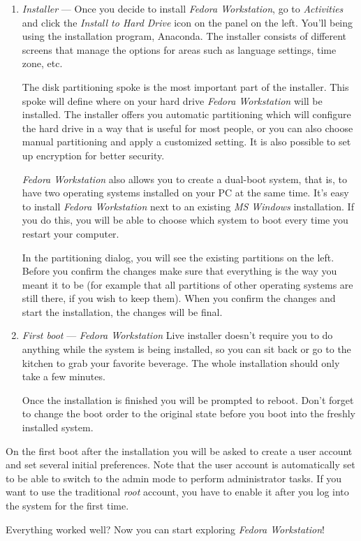 \begin{enumerate}
\item\emph{Installer} --- Once you decide to install \emph{Fedora Workstation}, go to \emph{Activities} and click the \emph{Install to Hard Drive} icon on the panel on the left. You'll being using the installation program, Anaconda. The installer consists of different screens that manage the options for areas such as language settings, time zone, etc.

The disk partitioning spoke is the most important part of the installer. This spoke will define where on your hard drive \emph{Fedora Workstation} will be installed. The installer offers you automatic partitioning which will configure the hard drive in a way that is useful for most people, or you can also choose manual partitioning and apply a customized setting. It is also possible to set up encryption for better security.

\emph{Fedora Workstation} also allows you to create a dual-boot system, that is, to have two operating systems installed on your PC at the same time. It's easy to install \emph{Fedora Workstation} next to an existing \emph{MS Windows} installation. If you do this, you will be able to choose which system to boot every time you restart your computer.

In the partitioning dialog, you will see the existing partitions on the left. Before you confirm the changes make sure that everything is the way you meant it to be (for example that all partitions of other operating systems are still there, if you wish to keep them). When you confirm the changes and start the installation, the changes will be final.

\item\emph{First boot} --- \emph{Fedora Workstation} Live installer doesn't require you to do anything while the system is being installed, so you can sit back or go to the kitchen to grab your favorite beverage. The whole installation should only take a few minutes.

Once the installation is finished you will be prompted to reboot. Don't forget to change the boot order to the original state before you boot into the freshly installed system.
\end{enumerate}

On the first boot after the installation you will be asked to create a user account and set several initial preferences. Note that the user account is automatically set to be able to switch to the admin mode to perform administrator tasks. If you want to use the traditional \emph{root} account, you have to enable it after you log into the system for the first time.

Everything worked well? Now you can start exploring \emph{Fedora Workstation}!
\endinput
